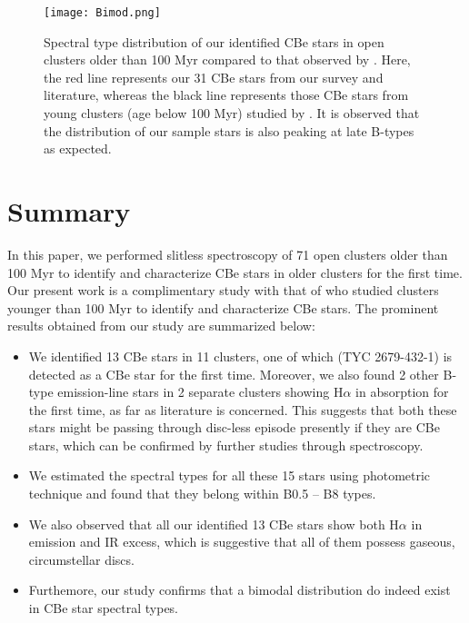 \documentclass{jaa}
\begin{document}
\begin{figure}
\centering    
\texttt{[image: Bimod.png]} 
\caption{Spectral type distribution of our identified CBe stars in open clusters older than 100 Myr compared to that observed by \cite{2008Mathew}. Here, the red line represents our 31 CBe stars from our survey and literature, whereas the black line represents those CBe stars from young clusters (age below 100 Myr) studied by \cite{2008Mathew}. It is observed that the distribution of our sample stars is also peaking at late B-types as expected.}
\end{figure}

\section{Summary}
In this paper, we performed slitless spectroscopy of 71 open clusters older than 100 Myr to identify and characterize CBe stars in older clusters for the first time. Our present work is a complimentary study with that of \cite{2008Mathew} who studied clusters younger than 100 Myr to identify and characterize CBe stars. The prominent results obtained from our study are summarized below:

\begin{itemize}
\item We identified 13 CBe stars in 11 clusters, one of which (TYC 2679-432-1) is detected as a CBe star for the first time. Moreover, we also found 2 other B-type emission-line stars in 2 separate clusters showing H$\alpha$ in absorption for the first time, as far as literature is concerned. This suggests that both these stars might be passing through disc-less episode presently if they are CBe stars, which can be confirmed by further studies through spectroscopy.
  
\item We estimated the spectral types for all these 15 stars using photometric technique and found that they belong within B0.5 -- B8 types. 

\item We also observed that all our identified 13 CBe stars show both H$\alpha$ in emission and IR excess, which is suggestive that all of them possess gaseous, circumstellar discs.
  
\item Furthemore, our study confirms that a bimodal distribution do indeed exist in CBe star spectral types.

\end{itemize}
\end{document}
